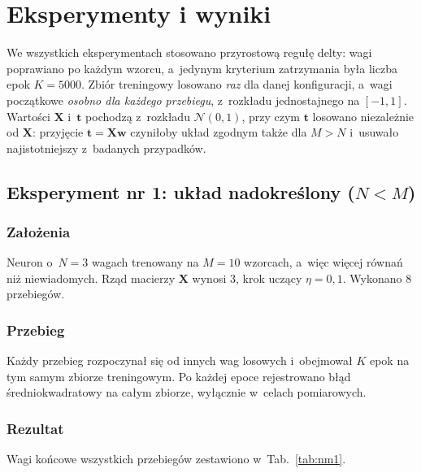 \documentclass[12pt]{article}
\begin{document}
\section{Eksperymenty i wyniki}

We wszystkich eksperymentach stosowano przyrostową regułę delty: wagi poprawiano po
każdym wzorcu, a~jedynym kryterium zatrzymania była liczba epok $K=5000$. Zbiór
treningowy losowano \emph{raz} dla danej konfiguracji, a~wagi początkowe
\emph{osobno dla każdego przebiegu}, z~rozkładu jednostajnego na $[-1,1]$. Wartości
$\mathbf{X}$ i~$\mathbf{t}$ pochodzą z~rozkładu $\mathcal{N}(0,1)$, przy czym
$\mathbf{t}$ losowano niezależnie od $\mathbf{X}$: przyjęcie
$\mathbf{t}=\mathbf{X}\mathbf{w}$ czyniłoby układ zgodnym także dla $M>N$ i~usuwało
najistotniejszy z~badanych przypadków.

\subsection{Eksperyment nr 1: układ nadokreślony \mbox{($N < M$)}}

\subsubsection{Założenia}
Neuron o~$N=3$ wagach trenowany na $M=10$ wzorcach, a~więc więcej równań niż
niewiadomych. Rząd macierzy $\mathbf{X}$ wynosi $3$, krok uczący $\eta = 0{,}1$.
Wykonano 8 przebiegów.

\subsubsection{Przebieg}
Każdy przebieg rozpoczynał się od innych wag losowych i~obejmował $K$ epok na tym
samym zbiorze treningowym. Po każdej epoce rejestrowano błąd średniokwadratowy na
całym zbiorze, wyłącznie w~celach pomiarowych.

\subsubsection{Rezultat}
Wagi końcowe wszystkich przebiegów zestawiono w~Tab.~\ref{tab:nm1}.
\end{document}
